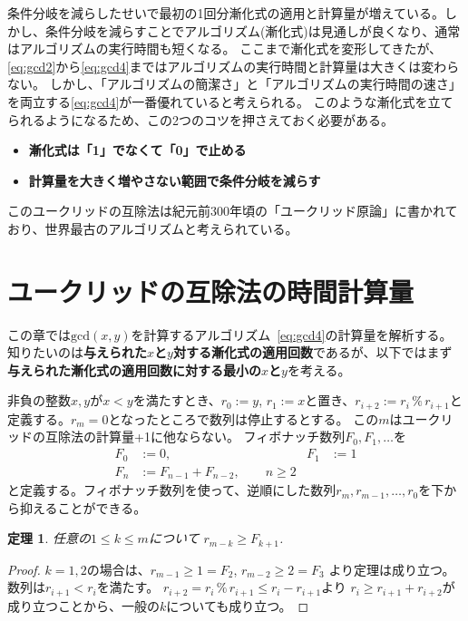 \documentclass[a4paper,twoside,onecolumn,openany,article,10pt]{memoir}
\newtheorem{theorem}{定理}
\theoremstyle{remark}
\begin{document}
条件分岐を減らしたせいで最初の1回分漸化式の適用と計算量が増えている。しかし、条件分岐を減らすことでアルゴリズム(漸化式)は見通しが良くなり、通常はアルゴリズムの実行時間も短くなる。
ここまで漸化式を変形してきたが、\eqref{eq:gcd2}から\eqref{eq:gcd4}まではアルゴリズムの実行時間と計算量は大きくは変わらない。
しかし、「アルゴリズムの簡潔さ」と「アルゴリズムの実行時間の速さ」を両立する\eqref{eq:gcd4}が一番優れていると考えられる。
このような漸化式を立てられるようになるため、この2つのコツを押さえておく必要がある。
\begin{itemize}
\item \textbf{漸化式は「1」でなくて「0」で止める}
\item \textbf{計算量を大きく増やさない範囲で条件分岐を減らす}
\end{itemize}
このユークリッドの互除法は紀元前300年頃の「ユークリッド原論」に書かれており、世界最古のアルゴリズムと考えられている。

\section{ユークリッドの互除法の時間計算量}\label{sec:ceuclidean}
この章では$\mathrm{gcd}(x,y)$を計算するアルゴリズム~\eqref{eq:gcd4}の計算量を解析する。
知りたいのは\textbf{与えられた$x$と$y$対する漸化式の適用回数}であるが、以下ではまず
\textbf{与えられた漸化式の適用回数に対する最小の$x$と$y$}を考える。

非負の整数$x,y$が$x<y$を満たすとき、$r_0:=y$, $r_1:=x$と置き、$r_{i+2} := r_{i}\,\%\,r_{i+1}$と定義する。$r_m=0$となったところで数列は停止するとする。
この$m$はユークリッドの互除法の計算量+1に他ならない。
フィボナッチ数列$F_0,F_1,\dotsc$を
\begin{align*}
F_0 &:= 0,& F_1 &:= 1\\
F_n &:= F_{n-1} + F_{n-2}, \qquad n\ge 2
\end{align*}
と定義する。フィボナッチ数列を使って、逆順にした数列$r_m, r_{m-1}, \dotsc, r_0$を下から抑えることができる。

\begin{theorem}
任意の$1\le k \le m$について
$r_{m-k}\ge F_{k+1}$.
\end{theorem}
\begin{proof}
$k=1,2$の場合は、$r_{m-1}\ge 1 = F_2$, $r_{m-2} \ge 2 = F_3$ より定理は成り立つ。
数列は$r_{i+1}<r_i$を満たす。
$r_{i+2} = r_i\,\%\,r_{i+1} \le r_i - r_{i+1}$より $r_i \ge r_{i+1} + r_{i+2}$が成り立つことから、一般の$k$についても成り立つ。
\end{proof}
\end{document}
